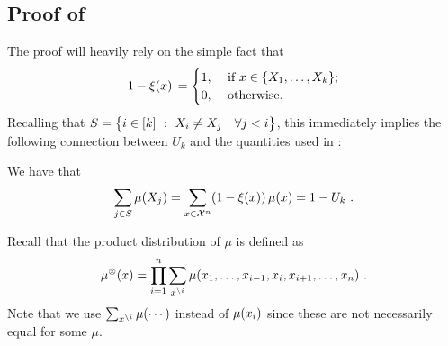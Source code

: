 \subsection{Proof of }
\label{sec:proof-of-emp-wav-MI}
%
The proof will heavily rely on the simple fact that
\begin{align}
  \label{eq:PX-i-xi}
 1-\xi(x) \,
 = \begin{cases}
 1, & \text{ if $x \in \{X_1,\ldots,X_k\}$;} \\
 0, & \text{ otherwise.}
 \end{cases}
\end{align}
%
Recalling that $S = \big\{i \in [k] ~:~ X_i \neq X_j \quad \forall j < i \big\}$, this immediately implies the following connection between $U_k$ and the quantities used in :
\begin{proposition}
  \label{prop:wav-missing-mass}
  We have that
  \begin{align*}
    \sum_{j \in S} \mu(X_j)
    =
    \sum_{x \in {\mathcal{X}}^n} (1-\xi(x)) \, \mu(x)
    = 1 - U_k~.
    \end{align*}
\end{proposition}
%
Recall that the product distribution of $\mu$ is defined as
\begin{align*}
  \mu^{\otimes}(x)
  = \prod_{i=1}^n \sum_{x^{\backslash i}} \mu(x_1, \ldots, x_{i-1}, x_i, x_{i+1}, \ldots, x_n)~.
\end{align*}
Note that we use $\sum_{x^{\backslash i}} \mu(\cdots)$ instead of $\mu(x_i)$ since these are not necessarily equal for some $\mu$.
%
%
